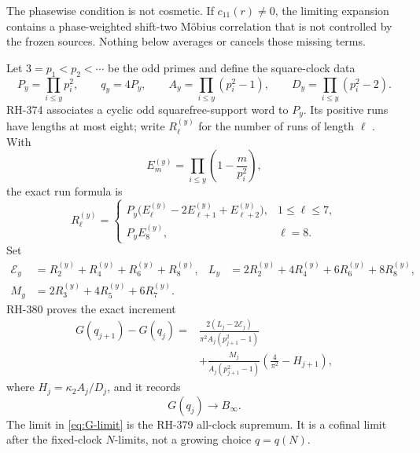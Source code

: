 \documentclass[11pt]{article}
\theoremstyle{definition}
\theoremstyle{remark}
\newcommand{\Ecal}{\mathcal E}
\newcommand{\kap}{\kappa_2}
\begin{document}
The phasewise condition is not cosmetic.  If $c_{11}(r)\ne0$, the limiting
expansion contains a phase-weighted shift-two M\"obius correlation that is
not controlled by the frozen sources.  Nothing below averages or cancels
those missing terms.

Let $3=p_1<p_2<\cdots$ be the odd primes and define the square-clock data
\begin{equation}
 P_y=\prod_{i\le y}p_i^2,\qquad q_y=4P_y,\qquad
 A_y=\prod_{i\le y}(p_i^2-1),\qquad
 D_y=\prod_{i\le y}(p_i^2-2).
 \label{eq:square-data}
\end{equation}
RH-374 associates a cyclic odd squarefree-support word to $P_y$.  Its
positive runs have lengths at most eight; write $R_\ell^{(y)}$ for the
number of runs of length $\ell$ \cite{RH374}.  With
\begin{equation}
 E_m^{(y)}=\prod_{i\le y}\left(1-\frac m{p_i^2}\right),
 \label{eq:finite-euler}
\end{equation}
the exact run formula is
\begin{equation}
 R_\ell^{(y)}=
 \begin{cases}
 P_y\bigl(E_\ell^{(y)}-2E_{\ell+1}^{(y)}+E_{\ell+2}^{(y)}\bigr),
      &1\le\ell\le7,\\
 P_yE_8^{(y)},&\ell=8.
 \end{cases}
 \label{eq:run-formula}
\end{equation}
Set
\begin{align}
 \Ecal_y&=R_2^{(y)}+R_4^{(y)}+R_6^{(y)}+R_8^{(y)},
 &L_y&=2R_2^{(y)}+4R_4^{(y)}+6R_6^{(y)}+8R_8^{(y)},
 \label{eq:EL}\\
 M_y&=2R_3^{(y)}+4R_5^{(y)}+6R_7^{(y)}.
 \label{eq:M}
\end{align}
RH-380 proves the exact increment
\begin{equation}
\begin{aligned}
G(q_{j+1})-G(q_j)
={}&\frac{2(L_j-2\Ecal_j)}{\pi^2A_j(p_{j+1}^2-1)}\\
&+\frac{M_j}{A_j(p_{j+1}^2-1)}
\left(\frac4{\pi^2}-H_{j+1}\right),
\end{aligned}
\label{eq:rh380-increment}
\end{equation}
where $H_j=\kap A_j/D_j$, and it records
\begin{equation}
 G(q_j)\longrightarrow B_\infty.
 \label{eq:G-limit}
\end{equation}
The limit in \eqref{eq:G-limit} is the RH-379 all-clock supremum.  It is a
cofinal limit after the fixed-clock $N$-limits, not a growing choice
$q=q(N)$.
\end{document}
